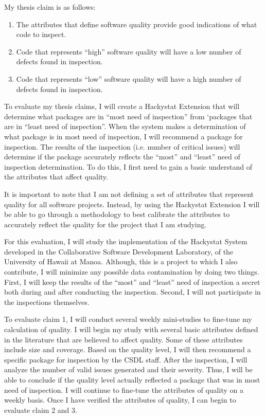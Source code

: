 \documentclass[11pt,twocolumn]{article}
\begin{document}
My thesis claim is as follows: 
\begin{enumerate}
\item The attributes that define software quality provide good indications
  of what code to inspect.
\item Code that represents ``high'' software quality will have a low number
  of defects found in inspection.
\item Code that represents ``low'' software quality will have a high number
  of defects found in inspection.
\end{enumerate}

\label{sec:evaluation}
To evaluate my thesis claims, I will create a Hackystat Extension that will
determine what packages are in ``most need of inspection'' from `packages
that are in ``least need of inspection''. When the system makes a
determination of what package is in most need of inspection, I will
recommend a package for inspection. The results of the inspection (i.e.
number of critical issues) will determine if the package accurately
reflects the ``most'' and ``least'' need of inspection determination.  To
do this, I first need to gain a basic understand of the attributes that
affect quality.

It is important to note that I am not defining a set of attributes that
represent quality for all software projects. Instead, by using the
Hackystat Extension I will be able to go through a methodology to best
calibrate the attributes to accurately reflect the quality for the project
that I am studying.

For this evaluation, I will study the implementation of the Hackystat
System developed in the Collaborative Software Development Laboratory, of
the University of Hawaii at Manoa. Although, this is a project to which I
also contribute, I will minimize any possible data contamination by doing
two things. First, I will keep the results of the ``most'' and ``least''
need of inspection a secret both during and after conducting the
inspection. Second, I will not participate in the inspections themselves.

To evaluate claim 1, I will conduct several weekly mini-studies to
fine-tune my calculation of quality. I will begin my study with several
basic attributes defined in the literature that are believed to affect
quality. Some of these attributes include size and coverage. Based on the
quality level, I will then recommend a specific package for inspection by
the CSDL staff. After the inspection, I will analyze the number of valid issues
generated and their severity. Thus, I will be able to conclude if the
quality level actually reflected a package that was in most need of inspection.
I will continue to fine-tune the attributes of quality on a weekly basis.
Once I have verified the attributes of quality, I can begin to evaluate
claim 2 and 3.
\end{document}
